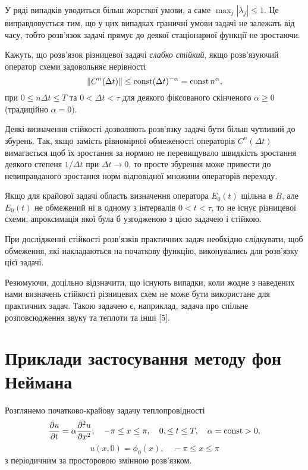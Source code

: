 У ряді випадків уводиться більш жорсткої умови, а саме $\max_j |\lambda_j| \le 1$. Це виправдовується тим, що у цих випадках граничні умови задачі не залежать від часу, тобто розв'язок задачі прямує до деякої стаціонарної функції не зростаючи. 

\begin{definition}
    Кажуть, що розв'язок різницевої задачі \emph{слабко стійкий}, якщо роз\-в'я\-зу\-ю\-чий оператор схеми задовольняє нерівності
    \begin{equation*}
        \|C^n(\Delta t)\| \le \operatorname{const} (\Delta t)^{-\alpha} = \operatorname{const} n^\alpha,
    \end{equation*}
    при $0 \le n \Delta t \le T$ та $0 < \Delta t < \tau$ для деякого фіксованого скінченого $\alpha \ge 0$ (традиційно $\alpha = 0$).
\end{definition}

Деякі визначення стійкості дозволяють розв'язку задачі бути більш чутливий до збурень. Так, якщо замість рівномірної обмеженості операторів $C^n(\Delta t)$ вимагається щоб їх зростання за нормою не перевищувало швидкість зростання деякого степеня $1/\Delta t$ при $\Delta t \to 0$, то просте збурення може привести до невиправданого зростання норм відповідної множини операторів переходу. \medskip

Якщо для крайової задачі область визначення оператора $E_0(t)$ щільна в $B$, але $E_0(t)$ не обмежений ні в одному з інтервалів $0 < t < \tau$, то не існує різницевої схеми, апроксимація якої була б узгодженою з цією задачею і стійкою. \medskip

При дослідженні стійкості розв'язків практичних задач необхідно слідкувати, щоб обмеження, які накладаються на початкову функцію, виконувались для розв'язку цієї задачі. \medskip

Резюмуючи, доцільно відзначити, що існують випадки, коли жодне з наведених нами визначень стійкості різницевих схем не може бути використане для практичних задач. Такою задачею є, наприклад, задача про спільне розповсюдження звуку та теплоти та інші [5].

\section{Приклади застосування методу фон Неймана}

\begin{example}
    Розглянемо початково-крайову задачу теплопровідності
    \begin{equation*}
        \frac{\partial u}{\partial t} = \alpha \frac{\partial^2 u}{\partial x^2}, \quad -\pi \le x \le \pi, \quad 0, \le t \le T, \quad \alpha = \operatorname{const} > 0,
    \end{equation*}
    \begin{equation*}
        u(x, 0) = \phi_0(x), \quad -\pi \le x \le \pi
    \end{equation*}
    з періодичним за просторовою змінною розв'язком.
\end{example}

